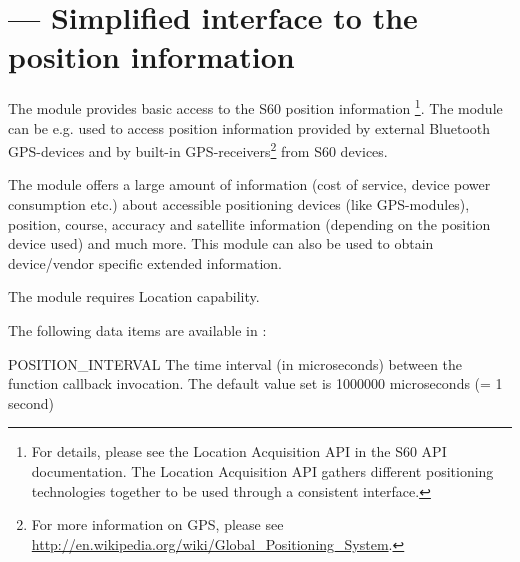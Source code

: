 %
%
%


\section{ ---
         Simplified interface to the position information}
\label{sec:position}


The  module provides basic access to the S60 position 
information \footnote{For details, please see the Location Acquisition API in 
the S60 API documentation. The Location Acquisition API gathers different 
positioning technologies together to be used through a consistent interface.}. 
The module can be e.g. used to access position information provided by external 
Bluetooth GPS-devices and by built-in GPS-receivers\footnote{For more 
information on GPS, please see 
\url{http://en.wikipedia.org/wiki/Global_Positioning_System}.} from S60 devices.

The module offers a large amount of information (cost of service, device power 
consumption etc.) about accessible positioning devices (like GPS-modules), 
position, course, accuracy and satellite information (depending on the position 
device used) and much more. This module can also be used to obtain device/vendor 
specific extended information.

\begin{notice}[note]
The  module  requires Location capability.
\end{notice}

The following data items are available in :

\begin{datadesc}{POSITION_INTERVAL}
The time interval (in microseconds) between the  function 
callback invocation. The default value set is 1000000 microseconds (= 1 
second)
\end{datadesc}


